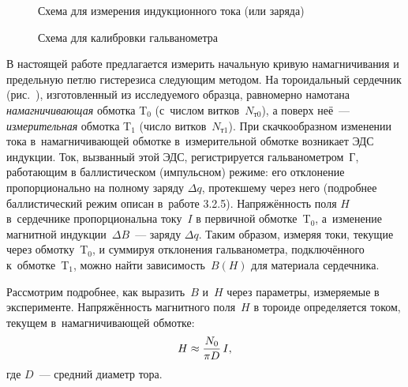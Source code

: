 
\begin{figure}[h!]
\hfil
\parbox{5cm}{%
	\begin{minipage}{5cm}
		\caption{Схема для измерения индукционного тока (или заряда)}
	\end{minipage}%
}\hfil
\parbox{5cm}{%
	\begin{minipage}{5cm}
		\caption{Схема для калибровки гальванометра}
	\end{minipage}
}
\end{figure}

В настоящей работе предлагается измерить начальную кривую намагничивания
и предельную петлю гистерезиса следующим методом.
На тороидальный сердечник (рис.~), изготовленный из исследуемого образца,
равномерно намотана \emph{намагничивающая} обмотка T$_0$
(с~числом витков~$N_{т0}$), а поверх неё~--- \emph{измерительная} обмотка
T$_1$
(число витков~$N_{т1}$).
При скачкообразном изменении тока в~намагничивающей обмотке
в~измерительной обмотке возникает ЭДС индукции. Ток, вызванный
этой ЭДС, регистрируется гальванометром~Г, работающим в баллистическом
(импульсном) режиме: его отклонение пропорционально на полному
заряду $\Delta q$, протекшему через него (подробнее баллистический режим
описан в~работе 3.2.5).
Напряжённость поля $H$ в~сердечнике пропорциональна току~$I$ в первичной
обмотке~T$_0$, а~изменение магнитной индукции~$\Delta B$~---
заряду $\Delta q$. Таким образом, измеряя токи,
текущие через обмотку~T$_0$, и суммируя отклонения гальванометра,
подключённого к~обмотке~T$_1$, можно найти
зависимость~$B(H)$ для материала сердечника.

Рассмотрим подробнее, как выразить~$B$ и~$H$ через параметры, измеряемые в
эксперименте. Напряжённость магнитного поля~$H$ в тороиде определяется током,
текущем в~намагничивающей обмотке:
\begin{equation}
	\eqmark{2}
	H\approx\frac{N_{0}}{\pi D}\,I,
\end{equation}
где $D$~--- средний диаметр тора.

